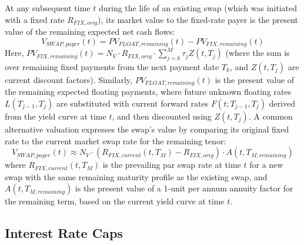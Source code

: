 \documentclass[11pt, a4paper, british]{article}
\begin{document}
At any subsequent time $t$ during the life of an existing swap (which was initiated with a fixed rate $R_{FIX,orig}$), its market value to the fixed-rate payer is the present value of the remaining expected net cash flows:
\begin{equation}
 V_{SWAP, payer}(t) = PV_{FLOAT,remaining}(t) - PV_{FIX,remaining}(t)
 \label{eq:swap_valuation_t_rigorous_final_v3}
\end{equation}
Here, $PV_{FIX, remaining}(t) = N_V \cdot R_{FIX,orig} \cdot \sum_{j=k}^{M} \tau_j Z(t, T_j)$ (where the sum is over remaining fixed payments from the next payment date $T_k$, and $Z(t, T_j)$ are current discount factors). Similarly, $PV_{FLOAT, remaining}(t)$ is the present value of the remaining expected floating payments, where future unknown floating rates $L(T_{j-1}, T_j)$ are substituted with current forward rates $F(t; T_{j-1}, T_j)$ derived from the yield curve at time $t$, and then discounted using $Z(t, T_j)$. A common alternative valuation expresses the swap's value by comparing its original fixed rate to the current market swap rate for the remaining tenor:
\begin{equation}
 V_{SWAP, payer}(t) \approx N_V \cdot (R_{FIX,current}(t, T_M) - R_{FIX,orig}) \cdot A(t, T_{M,remaining})
 \label{eq:swap_valuation_vs_current_rate_final_v3}
\end{equation}
where $R_{FIX, current}(t, T_M)$ is the prevailing par swap rate at time $t$ for a new swap with the same remaining maturity profile as the existing swap, and $A(t, T_{M, remaining})$ is the present value of a 1-unit per annum annuity factor for the remaining term, based on the current yield curve at time $t$.

\newpage

\subsection{Interest Rate Caps}
\end{document}
